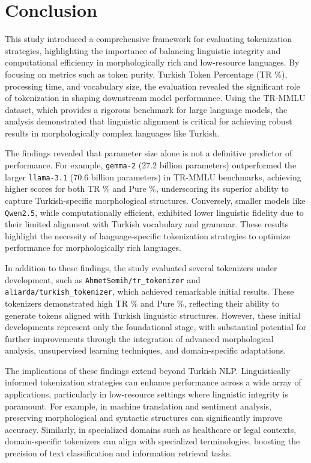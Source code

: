 \section{Conclusion}

This study introduced a comprehensive framework for evaluating tokenization strategies, highlighting the importance of balancing linguistic integrity and computational efficiency in morphologically rich and low-resource languages. By focusing on metrics such as token purity, Turkish Token Percentage (TR \%), processing time, and vocabulary size, the evaluation revealed the significant role of tokenization in shaping downstream model performance. Using the TR-MMLU dataset, which provides a rigorous benchmark for large language models, the analysis demonstrated that linguistic alignment is critical for achieving robust results in morphologically complex languages like Turkish.

The findings revealed that parameter size alone is not a definitive predictor of performance. For example, \texttt{gemma-2} (27.2 billion parameters) outperformed the larger \texttt{llama-3.1} (70.6 billion parameters) in TR-MMLU benchmarks, achieving higher scores for both TR \% and Pure \%, underscoring its superior ability to capture Turkish-specific morphological structures. Conversely, smaller models like \texttt{Qwen2.5}, while computationally efficient, exhibited lower linguistic fidelity due to their limited alignment with Turkish vocabulary and grammar. These results highlight the necessity of language-specific tokenization strategies to optimize performance for morphologically rich languages.

In addition to these findings, the study evaluated several tokenizers under development, such as \texttt{AhmetSemih/tr\_tokenizer} and \texttt{aliarda/turkish\_tokenizer}, which achieved remarkable initial results. These tokenizers demonstrated high TR \% and Pure \%, reflecting their ability to generate tokens aligned with Turkish linguistic structures. However, these initial developments represent only the foundational stage, with substantial potential for further improvements through the integration of advanced morphological analysis, unsupervised learning techniques, and domain-specific adaptations.

The implications of these findings extend beyond Turkish NLP. Linguistically informed tokenization strategies can enhance performance across a wide array of applications, particularly in low-resource settings where linguistic integrity is paramount. For example, in machine translation and sentiment analysis, preserving morphological and syntactic structures can significantly improve accuracy. Similarly, in specialized domains such as healthcare or legal contexts, domain-specific tokenizers can align with specialized terminologies, boosting the precision of text classification and information retrieval tasks.

